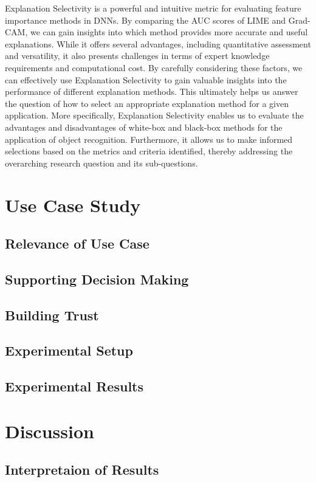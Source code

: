 \documentclass{article}
\begin{document}
Explanation Selectivity is a powerful and intuitive metric for evaluating feature importance methods in DNNs. By comparing the AUC scores of LIME and Grad-CAM, we can gain insights into which method provides more accurate and useful explanations. While it offers several advantages, including quantitative assessment and versatility, it also presents challenges in terms of expert knowledge requirements and computational cost. By carefully considering these factors, we can effectively use Explanation Selectivity to gain valuable insights into the performance of different explanation methods. This ultimately helps us answer the question of how to select an appropriate explanation method for a given application. More specifically, Explanation Selectivity enables us to evaluate the advantages and disadvantages of white-box and black-box methods for the application of object recognition. Furthermore, it allows us to make informed selections based on the metrics and criteria identified, thereby addressing the overarching research question and its sub-questions.


\section{Use Case Study}
\subsection{Relevance of Use Case}
\subsection{Supporting Decision Making}
\subsection{Building Trust}
\subsection{Experimental Setup}
\subsection{Experimental Results}

\section{Discussion}
\subsection{Interpretaion of Results}
\end{document}
